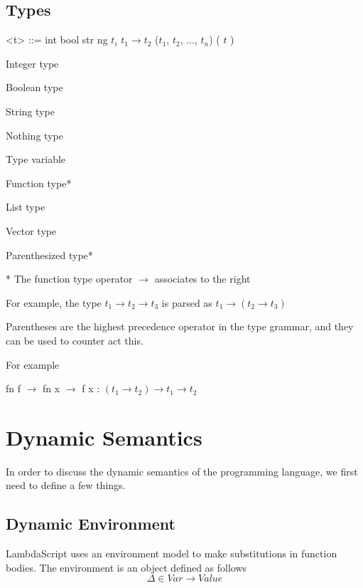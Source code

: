 \documentclass[titlepage]{article}
\begin{document}
\subsection{Types}
\begin{minipage}[t]{0.5\textwidth}
\begin{grammar}
<t> ::= int
\alt bool
\alt str
\alt ng
\alt $t_i$
\alt $t_1 \rightarrow t_2$
\alt ($t_1$, $t_2$, ..., $t_n$)
\alt ( $t$ )
\end{grammar}
\end{minipage}%
\begin{minipage}[t]{0.5\textwidth}
  Integer type

  Boolean type

  String type

  Nothing type

  Type variable

  Function type*

  List type

  Vector type

  Parenthesized type*
  \end{minipage}%

\vspace{0.25in}
* The function type operator $\rightarrow$ associates to the right

For example, the type $t_1 \rightarrow t_2 \rightarrow t_3$ is parsed as $t_1 \rightarrow (t_2 \rightarrow t_3)$

Parentheses are the highest precedence operator in the type grammar, and they can be used to counter act this.

For example

\begin{center}

fn f $\rightarrow$ fn x $\rightarrow$ f x : $(t_1 \rightarrow t_2) \rightarrow t_1 \rightarrow t_2$

\end{center}



\newpage
\section{Dynamic Semantics}

In order to discuss the dynamic semantics of the programming language, we first need to
define a few things.


\subsection{Dynamic Environment}
LambdaScript uses an environment model to make substitutions in function bodies. The environment is an object defined as follows
$$\Delta \in Var  \rightarrow Value$$
\end{document}
